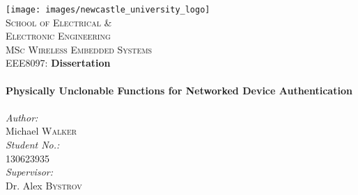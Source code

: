 \begin{titlepage}

\begin{center}


\texttt{[image: images/newcastle\_university\_logo]}
\\[1cm]
\textsc{\Large School of Electrical \& \\Electronic Engineering}
\\[0.5cm]

\textsc{\large MSc Wireless Embedded Systems}\\[1cm]
\Large{EEE8097: \bfseries Dissertation}
\\[1cm]

\HRule
\\[0.4cm]
{\huge \bfseries Physically Unclonable Functions for Networked Device Authentication
\\[0.4cm] }
\HRule \\[1.5cm]

\large
\emph{Author:}\\Michael \textsc{Walker}
\\[0.5cm]
\emph{Student No.:}\\130623935
\\[1cm]
\emph{Supervisor:}\\Dr. Alex \textsc{Bystrov}

\end{center}


\end{titlepage}

\cleardoublepage
